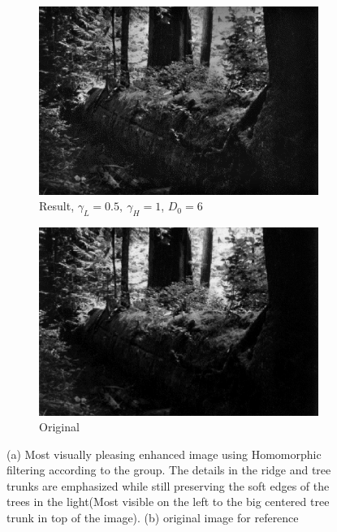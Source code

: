 		\begin{figure}[h!]
			\centering
			\begin{subfigure}[b]{0.5\linewidth}
				\includegraphics[width=0.9\linewidth]{pics/better_res.png}
				\caption{Result, $\gamma_L = 0.5,~\gamma_H = 1$, $D_0 = 6$}
				\label{fig:result}
			\end{subfigure}%
			\begin{subfigure}[b]{0.5\linewidth}
				\includegraphics[width=0.9\linewidth]{pics/orig_pic.png}
				\caption{Original}
				\label{fig:orig2}
			\end{subfigure}
			\label{fig:resComp}
		\caption{(a) Most visually pleasing enhanced image using Homomorphic filtering according to the group. The details in the ridge and tree trunks are emphasized while still preserving the soft edges of the trees in the light(Most visible on the left to the big centered tree trunk in top of the image). (b) original image for reference}				
		\end{figure}		

